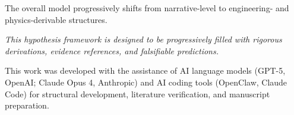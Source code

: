 \documentclass[aps,prd,twocolumn,superscriptaddress,nofootinbib]{revtex4-2}
\begin{document}
The overall model progressively shifts from narrative-level to engineering- and physics-derivable structures.

\textit{This hypothesis framework is designed to be progressively filled with rigorous derivations, evidence references, and falsifiable predictions.}


\begin{acknowledgments}
This work was developed with the assistance of AI language models (GPT-5, OpenAI; Claude Opus 4, Anthropic) and AI coding tools (OpenClaw, Claude Code) for structural development, literature verification, and manuscript preparation.
\end{acknowledgments}


\end{document}
